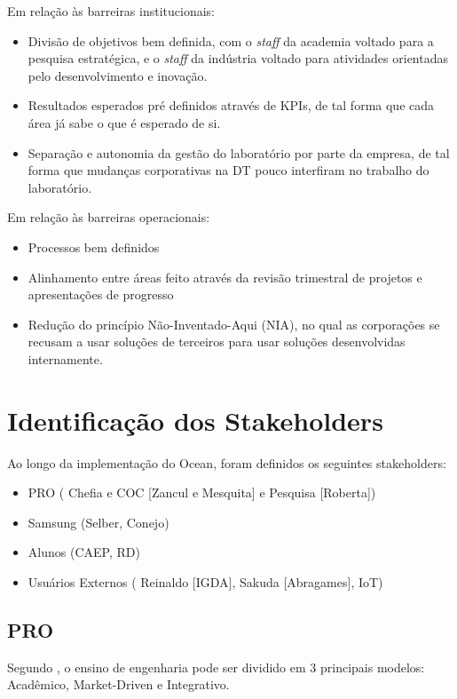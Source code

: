 Em relação às barreiras institucionais:
\begin{itemize}
\item Divisão de objetivos bem definida, com o \textit{staff} da academia voltado para a pesquisa estratégica, e o \textit{staff} da indústria voltado para atividades orientadas pelo desenvolvimento e inovação.
\item Resultados esperados pré definidos através de KPIs, de tal forma que cada área já sabe o que é esperado de si.
\item Separação e autonomia da gestão do laboratório por parte da empresa, de tal forma que mudanças corporativas na DT pouco interfiram no trabalho do laboratório.
\end{itemize}

Em relação às barreiras operacionais:
\begin{itemize}
\item Processos bem definidos 
\item Alinhamento entre áreas feito através da revisão trimestral de projetos e apresentações de progresso
\item Redução do princípio Não-Inventado-Aqui (NIA), no qual as corporações se recusam a usar soluções de terceiros para usar soluções desenvolvidas internamente.
\end{itemize}



\section{Identificação dos Stakeholders}
\label{sec:identificacao_stakeholders}

Ao longo da implementação do Ocean, foram definidos os seguintes stakeholders:

\begin{itemize}
\item PRO ( Chefia e COC [Zancul e Mesquita] e Pesquisa [Roberta])
\item Samsung (Selber, Conejo)
\item Alunos (CAEP, RD)
\item Usuários Externos ( Reinaldo [IGDA], Sakuda [Abragames], IoT)
\end{itemize}

\subsection{PRO}
\label{sec:con_pro}

Segundo , o ensino de engenharia pode ser dividido em 3 principais modelos: Acadêmico, Market-Driven e Integrativo.

